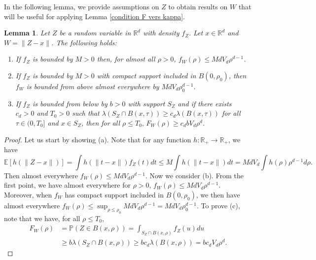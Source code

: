 \documentclass[paper=a4, fontsize=11pt]{scrartcl}
\newcommand{\PP}{\mathbb{P}}
\newtheorem{lemma}[theorem]{Lemma}
\begin{document}
In the following lemma, we provide assumptions on $Z$ to obtain results on $W$ that will be useful for applying Lemma \ref{condition F vers kappa}.

\begin{lemma}\label{Z vers X}
 Let $ Z $ be a random variable in $\mathbb R^d$ with density $f_Z$. Let $x\in \mathbb R^d$ and $W =\| Z - x\| $. The following holds:
\begin{enumerate}[label={(\alph*)}]
    \item  If $f_{Z} $ is bounded  by $M > 0$ then, for almost all $\rho>0$, $f_W(\rho) \leq Md V_d \rho^{d-1}$. 
    \item If $f_{Z} $ is bounded  by $M>0$ with compact support included in $B (0, \rho_0)$, then $f_W $ is bounded from above almost everywhere by $M d V_d \rho_0^{d-1}.$
    \item If $f_{Z}$ is bounded from below by $b > 0$ with support $S_{Z}$ and if there exists $c_d>0$ and $T_0>0$ such that $\lambda (S_{Z} \cap B(x, \tau ) ) \geq c_d \lambda   (B(x, \tau ))$ for all $\tau \in (0,T_0]$ and $x\in S_{Z}$, then for all $\rho \leq T_0, \, F_W(\rho) \geq c_d b V_d \rho^d$.
\end{enumerate}  
\end{lemma}  

\begin{proof}
Let us start by showing (a). Note that for any function $h: \mathbb R_{+} \to \mathbb R_{+}$, we have
\begin{equation*}
\mathbb   E [  h(\|{Z-x}\|)  ] = \int h(\|t-x\| )  f_{Z}(t)  dt \leq M  \int h(\|t-x\| ) dt = Md V_d \int h(\rho)\rho^{d-1} d\rho .     
\end{equation*}
Then almost everywhere $f_W(\rho) \leq Md V_d \rho^{d-1}$. Now we consider (b). 
From the first point, we have almost everywhere for $\rho > 0$, $f_W(\rho) \leq Md V_d \rho^{d-1}.$ Moreover, when $f_W$ has compact support included in $B(0, \rho_0)$, we then have almost everywhere $f_W(\rho) \leq \sup_{\rho \leq \rho_0} Md V_d \rho^{d-1} = Md V_d \rho_0^{d-1}.$ 
To prove (c), note that we have, for all $\rho \leq T_0$,
\begin{align*}
 F_W(\rho) &= \PP({Z} \in B(x, \rho)) = \int_{S_{Z}\cap B (x,\rho)} f_{Z}(u) du \\ &\geq b  \lambda (S_{Z}\cap B (x,\rho) ) \geq b c_d \lambda (B(x,\rho) ) = bc_d V_d \rho^d.    
\end{align*} 
\end{proof}
\end{document}
